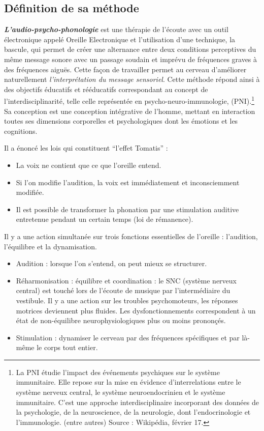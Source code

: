 




\subsection{Définition de sa méthode} 

\emph\textbf{{L'audio-psycho-phonologie}}
est une thérapie de l'écoute avec un
 outil électronique appelé
\label{outil_oreille_electro}
Oreille Electronique et l'utilisation d'une technique, la 
bascule, qui permet de créer une alternance entre deux conditions perceptives 
du même message sonore avec un passage soudain et imprévu de fréquences graves à des 
fréquences aiguës. Cette façon de travailler permet au
cerveau d'améliorer naturellement \emph{l'interprétation du message
sensoriel}.
Cette méthode répond ainsi à des objectifs éducatifs et rééducatifs
correspondant au concept de l'interdisciplinarité, telle celle représentée en 
psycho-neuro-immunologie,
(PNI).\footnote{La PNI étudie 
l'impact des événements psychiques sur le système immunitaire. Elle repose sur 
la mise en évidence d'interrelations entre le système
nerveux central, le système neuroendocrinien et le système immunitaire.
C'est une approche interdisciplinaire incorporant des données de la
psychologie, de la neuroscience, de la neurologie, dont l'endocrinologie
et l'immunologie. (entre autres) Source : Wikipédia, février 17.}
Sa conception est une conception intégrative
de l'homme, mettant en interaction toutes ses dimensions corporelles
et psychologiques dont 
les émotions et les cognitions.


Il a énoncé les lois qui constituent ``l'effet Tomatis'' : 
\begin{itemize}
	\item La voix ne contient que ce que l'oreille entend.
	\item Si l'on modifie l'audition, la voix est immédiatement et 
inconsciemment
		modifiée.
	\item Il est possible de transformer la phonation par une stimulation 
auditive
		entretenue pendant un certain temps (loi de rémanence).
\end{itemize}

Il y a une action simultanée sur trois fonctions essentielles de l'oreille
: l'audition, l'équilibre et la dynamisation.
\begin{itemize}
	\item Audition : lorsque l'on s'entend, on peut mieux se structurer.
	\item Réharmonisation : équilibre et coordination : le SNC (système 
nerveux
		central) est touché lors de l'écoute de musique par 
l'intermédiaire
		du vestibule. Il y a une action sur les troubles psychomoteurs, 
les
		réponses motrices deviennent plus fluides. Les 
dysfonctionnements
		correspondent à un état de non-équilibre neurophysiologiques 
plus
		ou moins prononçés. 
	\item Stimulation : dynamiser le cerveau par des fréquences spécifiques
          et par là-même le corps tout entier.

 
\end{itemize}



